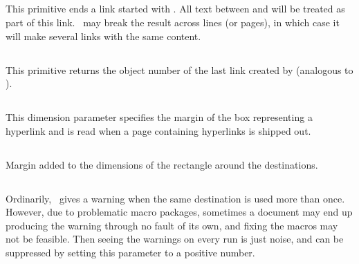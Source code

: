 \documentclass{pdftexmanual}
\begin{document}
\subsection{}

This primitive ends a link started with . All text
between  and  will be treated as part
of this link. \PDFTEX\ may break the result across lines (or pages), in which
case it will make several links with the same content.

\subsection{}

This primitive returns the object number of the last link created by
 (analogous to ).

\subsection{}

This dimension parameter specifies the margin of the box representing
a hyperlink and is read when a page containing hyperlinks is shipped out.

\subsection{}

Margin added to the dimensions of the rectangle around the destinations.

\subsection{}

Ordinarily, \PDFTEX\ gives a warning when the same destination is used
more than once. However, due to problematic macro packages, sometimes a
document may end up producing the warning through no fault of its own,
and fixing the macros may not be feasible. Then seeing the warnings on
every run is just noise, and can be suppressed by setting this parameter
to a positive number. 
\end{document}
